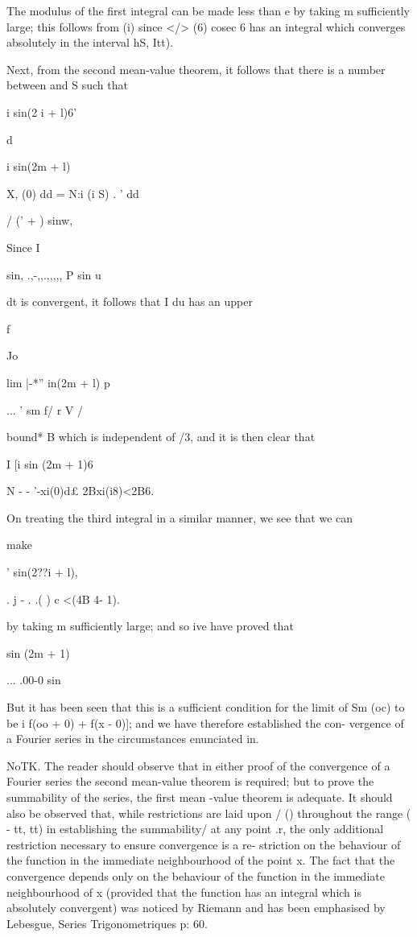 The modulus of the first integral can be made less than e by taking m
sufficiently large; this follows from (i) since </> (6) cosec
6 has an integral which converges absolutely in the interval hS, Itt).

Next, from the second mean-value theorem, it follows that there is a
number between and S such that

i sin(2 i + l)6'

d

i sin(2m + l)

X, (0) dd = N:i (i S) . ' dd

  / (' + ) sinw,

Since I

sin, .,-,,.,,,,, P sin u

dt is convergent, it follows that I du has an upper

f

Jo

lim |-*'' in(2m + l) p

... ' sm f/ r V /

bound* B which is independent of /3, and it is then clear that

I [i sin (2m + 1)6

N - - '-xi(0)d£ 2Bxi(i8)<2B6.

On treating the third integral in a similar manner, we see that we can

make

  ' sin(2??i + l),

. j - . .( ) c <(4B 4- 1).

by taking m sufficiently large; and so ive have proved that

sin (2m + 1)

... .00-0 sin

But it has been seen that this is a sufficient condition for the limit
of Sm (oc) to be i f(oo + 0) + f(x - 0)]; and we have therefore
established the con- vergence of a Fourier series in the circumstances
enunciated in.

NoTK. The reader should observe that in either proof of the
convergence of a Fourier series the second mean-value theorem is
required; but to prove the summability of the series, the first mean
-value theorem is adequate. It should also be observed that, while
restrictions are laid upon / () throughout the range ( - tt, tt) in
establishing the summability/ at any point .r, the only additional
restriction necessary to ensure convergence is a re- striction on the
behaviour of the function in the immediate neighbourhood of the point
x. The fact that the convergence depends only on the behaviour of the
function in the immediate neighbourhood of x (provided that the
function has an integral which is absolutely convergent) was noticed
by Riemann and has been emphasised by Lebesgue, Series
Trigonometriques p: 60.

